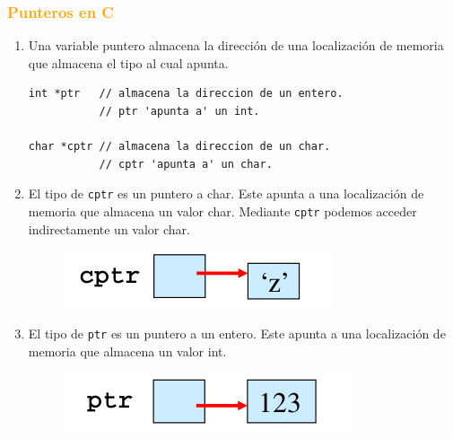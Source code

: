 \documentclass[serif, professionalfont]{beamer}
\newcommand\Fontvi{\fontsize{10}{9.2}\selectfont}
\begin{document}
\begin{frame}[fragile]{}
	\frametitle{\textcolor{orange}{\hspace{4.0 cm} Punteros en C}}
	\Fontvi
\begin{enumerate}
\item Una variable puntero almacena la direcci\'on de una localizaci\'on de memoria que almacena el tipo al cual apunta.
 
 
\begin{verbatim}
int *ptr   // almacena la direccion de un entero.
           // ptr 'apunta a' un int.
			           
char *cptr // almacena la direccion de un char.
           // cptr 'apunta a' un char.
\end{verbatim}
\item El tipo de \texttt{cptr} es un puntero a char. Este apunta a una localizaci\'on de memoria que almacena un valor char. Mediante \texttt{cptr} podemos acceder indirectamente un valor char. 
\begin{figure}[h]
	\centering
	\includegraphics[scale=.42]{j1.png}
\end{figure}
\item El tipo de \texttt{ptr} es un puntero a un entero. Este apunta a una localizaci\'on de memoria que almacena un valor int.

\begin{figure}[h]
	\centering
	\includegraphics[scale=.42]{j2.png}
\end{figure}
\end{enumerate}
\end{frame}
\end{document}
